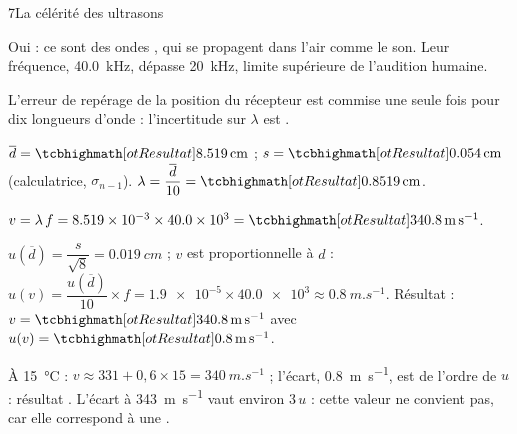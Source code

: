 

\begin{corrigeBac}{7}{La célérité des ultrasons}
\begin{questions}
\item Oui : ce sont des ondes , qui se propagent dans l'air comme le son. Leur fréquence, \qty{40,0}{kHz}, dépasse
\qty{20}{kHz}, limite supérieure de l'audition humaine. 
\item L'erreur de repérage de la position du récepteur est commise une seule fois pour dix longueurs d'onde : l'incertitude
sur $\lambda$ est . \pts{1 pt}
\item $\overline{d}=\res{\qty{8,519}{cm}}$ ; $s=\res{\qty{0,054}{cm}}$ (calculatrice, $\sigma_{n-1}$). $\lambda=\dfrac{\overline{d}}{10}=\res{\qty{0,8519}{cm}}$. 
\item $v=\lambda\,f=\num{8,519e-3}\times\num{40,0e3}=\res{\qty{340,8}{m.s^{-1}}}$. \pts{1 pt}
\item $u(\overline{d})=\dfrac{s}{\sqrt{8}}=\qty{0,019}{cm}$ ; $v$ est proportionnelle à $d$ : $u(v)=\dfrac{u(\overline{d})}{10}\times f=\num{1,9e-5}\times\num{40,0e3}\approx\qty{0,8}{m.s^{-1}}$.
Résultat : $v=\res{\qty{340,8}{m.s^{-1}}}$ avec $u(v)=\res{\qty{0,8}{m.s^{-1}}}$. 
\item À \qty{15}{\degreeCelsius} : $v\approx331+0{,}6\times15=\qty{340}{m.s^{-1}}$ ; l'écart, \qty{0,8}{m.s^{-1}}, est de l'ordre de $u$ : résultat .
L'écart à \qty{343}{m.s^{-1}} vaut environ $3\,u$ : cette valeur ne convient pas, car elle correspond à une . 
\end{questions}
\end{corrigeBac}

